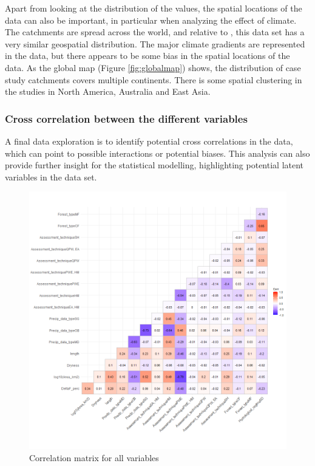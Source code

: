 \documentclass[]{elsarticle} %
\begin{document}
Apart from looking at the distribution of the values, the spatial locations of the data can also be important, in particular when analyzing the effect of climate. The catchments are spread across the world, and relative to \citet{zhang2017}, this data set has a very similar geospatial distribution. The major climate gradients are represented in the data, but there appears to be some bias in the spatial locations of the data. As the global map (Figure \ref{fig:globalmap}) shows, the distribution of case study catchments covers multiple continents. There is some spatial clustering in the studies in North America, Australia and East Asia.

\hypertarget{cross-correlation-between-the-different-variables}{%
\subsubsection{Cross correlation between the different variables}\label{cross-correlation-between-the-different-variables}}

A final data exploration is to identify potential cross correlations in the data, which can point to possible interactions or potential biases. This analysis can also provide further insight for the statistical modelling, highlighting potential latent variables in the data set.

\begin{figure}
\includegraphics[width=0.9\linewidth]{variable_corr_plot} \caption{Correlation matrix for all variables}\label{fig:corgraphs}
\end{figure}
\end{document}
